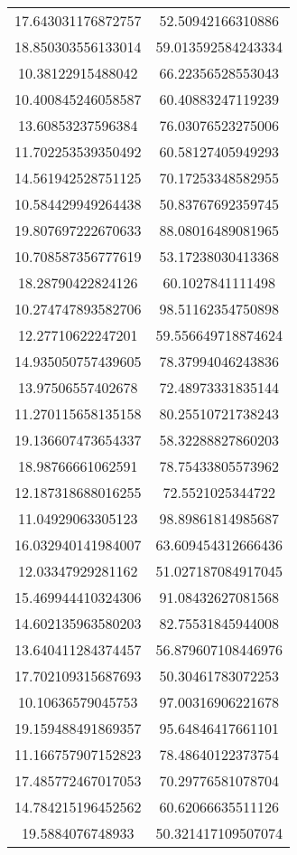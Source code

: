 \begin{table}
\begin{tabular}{cc}
17.643031176872757 & 52.50942166310886 \\
18.850303556133014 & 59.013592584243334 \\
10.38122915488042 & 66.22356528553043 \\
10.400845246058587 & 60.40883247119239 \\
13.60853237596384 & 76.03076523275006 \\
11.702253539350492 & 60.58127405949293 \\
14.561942528751125 & 70.17253348582955 \\
10.584429949264438 & 50.83767692359745 \\
19.807697222670633 & 88.08016489081965 \\
10.708587356777619 & 53.17238030413368 \\
18.28790422824126 & 60.1027841111498 \\
10.274747893582706 & 98.51162354750898 \\
12.27710622247201 & 59.556649718874624 \\
14.935050757439605 & 78.37994046243836 \\
13.97506557402678 & 72.48973331835144 \\
11.270115658135158 & 80.25510721738243 \\
19.136607473654337 & 58.32288827860203 \\
18.98766661062591 & 78.75433805573962 \\
12.187318688016255 & 72.5521025344722 \\
11.04929063305123 & 98.89861814985687 \\
16.032940141984007 & 63.609454312666436 \\
12.03347929281162 & 51.027187084917045 \\
15.469944410324306 & 91.08432627081568 \\
14.602135963580203 & 82.75531845944008 \\
13.640411284374457 & 56.879607108446976 \\
17.702109315687693 & 50.30461783072253 \\
10.10636579045753 & 97.00316906221678 \\
19.159488491869357 & 95.64846417661101 \\
11.166757907152823 & 78.48640122373754 \\
17.485772467017053 & 70.29776581078704 \\
14.784215196452562 & 60.62066635511126 \\
19.5884076748933 & 50.321417109507074 \\

\end{tabular}
\end{table}
